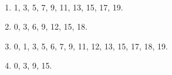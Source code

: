          ~\\
         \begin{enumerate}
         \item 1, 3, 5, 7, 9, 11, 13, 15, 17, 19.
         \item 0, 3, 6, 9, 12, 15, 18.
         \item 0, 1, 3, 5, 6, 7, 9, 11, 12, 13, 15, 17, 18, 19.
         \item 0, 3, 9, 15.
         \end{enumerate}
